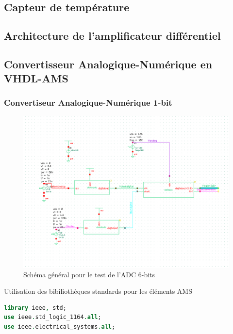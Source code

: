 \documentclass[a4paper]{article}
\begin{document}
\subsection{Capteur de temp\'erature}
\subsection{Architecture de l'amplificateur diff\'erentiel}

\clearpage
\subsection{Convertisseur Analogique-Num\'erique en VHDL-AMS}

\subsubsection{Convertiseur Analogique-Num\'erique 1-bit}

\begin{figure}[!htb]
\begin{center}
  \includegraphics[scale=0.60]{Architecture-ADC-test.png}
  \caption{Sch\'ema g\'en\'eral pour le test de l'ADC 6-bits }
\end{center}
\end{figure}

Utilisation des bibilioth\`eques standards pour les \'el\'ements AMS
\begin{lstlisting}[language=VHDL, belowskip=-0.5 \baselineskip]
library ieee, std;
use ieee.std_logic_1164.all;
use ieee.electrical_systems.all;
\end{lstlisting}
\end{document}

